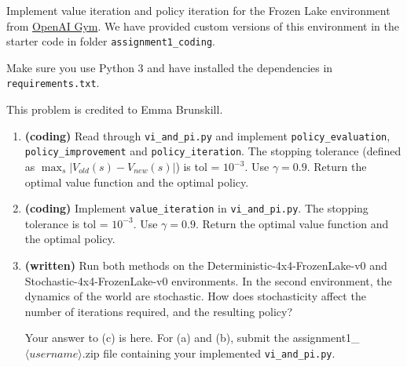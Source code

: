 \documentclass[11pt]{article}
\theoremstyle{case}
\begin{document}
Implement value iteration and policy iteration for the Frozen Lake environment
from \href{"https://gym.openai.com/envs/FrozenLake-v0"}{OpenAI Gym}. We have provided
custom versions of this environment in the starter code in folder \texttt{assignment1\_coding}.

Make sure you use Python 3 and have installed the dependencies in \texttt{requirements.txt}.

This problem is credited to Emma Brunskill.

\begin{enumerate}[label=(\alph*)]
\item \textbf{(coding)} Read through \texttt{vi\_and\_pi.py} and implement \texttt{policy\_evaluation}, \texttt{policy\_improvement} and \texttt{policy\_iteration}. The stopping tolerance (defined as $\max_s |V_{old}(s) - V_{new}(s)|$) is tol = $10^{-3}$. Use $\gamma = 0.9$. Return the optimal value function and the optimal policy.
\item \textbf{(coding)} Implement \texttt{value\_iteration} in \texttt{vi\_and\_pi.py}. The stopping tolerance is tol =
$10^{-3}$. Use $\gamma = 0.9$. Return the optimal value function and the optimal policy.
\item \textbf{(written)} Run both methods on the Deterministic-4x4-FrozenLake-v0 and Stochastic-4x4-FrozenLake-v0 environments. In the second environment, the dynamics of the world are stochastic. How does stochasticity affect the number of iterations required, and the resulting policy?
\begin{shaded}
    Your answer to (c) is here. For (a) and (b), submit the assignment1\_$\langle username \rangle$.zip file containing your implemented \texttt{vi\_and\_pi.py}.
\end{shaded}

\end{enumerate}
\end{document}
